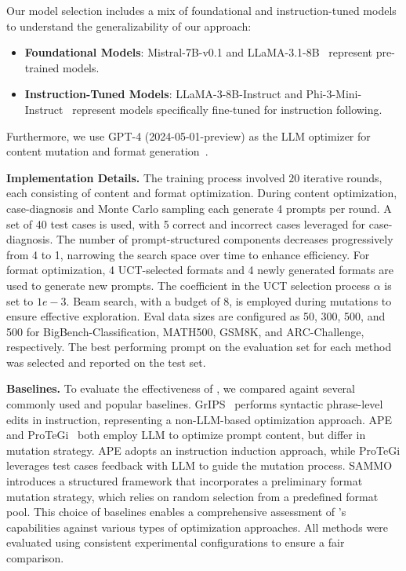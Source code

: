 Our model selection includes a mix of foundational and instruction-tuned models to understand the generalizability of our approach:
\begin{itemize}[itemsep=-4pt, topsep=0pt]
    \item \textbf{Foundational Models}: Mistral-7B-v0.1 \citep{jiang2023mistral7b} and LLaMA-3.1-8B~\citep{grattafiori2024llama3herdmodels} represent pre-trained models.
    \item \textbf{Instruction-Tuned Models}: LLaMA-3-8B-Instruct \citep{llama3} and Phi-3-Mini-Instruct~\citep{abdin2024phi3technicalreporthighly} represent models specifically fine-tuned for instruction following.
\end{itemize}
Furthermore, we use GPT-4 (2024-05-01-preview) as the LLM optimizer for content mutation and format generation~\citep{openai2024gpt4technicalreport}.

\noindent \textbf{Implementation Details.}
The training process involved $20$ iterative rounds, each consisting of content and format optimization.
During content optimization, case-diagnosis and Monte Carlo sampling each generate 4 prompts per round. A set of 40 test cases is used, with 5 correct and incorrect cases leveraged for case-diagnosis. The number of prompt-structured components decreases progressively from 4 to 1, narrowing the search space over time to enhance efficiency.
For format optimization, 4 UCT-selected formats and 4 newly generated formats are used to generate new prompts. The coefficient in the UCT selection process $\alpha$ is set to $1e-3$. 
Beam search, with a budget of 8, is employed during mutations to ensure effective exploration. Eval data sizes are configured as 50, 300, 500, and 500 for BigBench-Classification, MATH500, GSM8K, and ARC-Challenge, respectively. 
The best performing prompt on the evaluation set for each method was selected and reported on the test set.

\noindent \textbf{Baselines.} 
To evaluate the effectiveness of \sysname{}, we compared againt several commonly used and popular baselines.
GrIPS~\citep{prasad2023grips} performs syntactic phrase-level edits in instruction, representing a non-LLM-based optimization approach. APE~\citep{zhou2023ape} and ProTeGi~\citep{C_2023EMNLP_APO} both employ LLM to optimize prompt content, but differ in mutation strategy. APE adopts an instruction induction approach, while ProTeGi leverages test cases feedback with LLM to guide the mutation process.
SAMMO~\citep{C_2024EMNLP_sammo} introduces a structured framework that incorporates a preliminary format mutation strategy, which relies on random selection from a predefined format pool.
This choice of baselines enables a comprehensive assessment of \sysname{}'s capabilities against various types of optimization approaches. All methods were evaluated using consistent experimental configurations to ensure a fair comparison.


